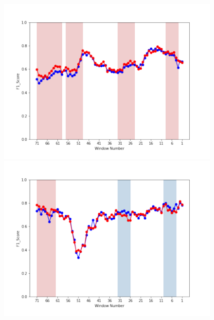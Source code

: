 \documentclass[submit]{ipsj}
\begin{document}
\begin{figure}[t]
\centering
\begin{minipage}[b]{0.65\columnwidth}
    \centering
    \includegraphics[width=1\columnwidth]{Uenaka_fig/RQ2_result/Nova/Nova_review_F1.pdf}
    \includegraphics[width=1\columnwidth]{Uenaka_fig/RQ2_result/Neutron/Neutron_review_F1.pdf}
\end{minipage}
\begin{minipage}[b]{0.65\columnwidth}
    \centering

\end{minipage}
\end{figure}
\end{document}
